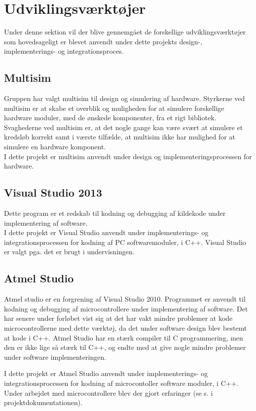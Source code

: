 \section{Udviklingsværktøjer}
Under denne sektion vil der blive gennemgået de forskellige udviklingsværktøjer som hovedsageligt er blevet anvendt under dette projekts design-, implementerings- og integrationsproces.

\subsection{Multisim}
Gruppen har valgt multisim til design og simulering af hardware. Styrkerne ved multisim er at skabe et overblik og muligheden for at simulere forskellige hardware moduler, med de ønskede komponenter, fra et rigt bibliotek. Svaghederne ved multisim er, at det nogle gange kan være svært at simulere et kredsløb korrekt samt i værste tilfælde, at multisim ikke har mulighed for at simulere en hardware komponent.\\
I dette projekt er multisim anvendt under design og implementeringsprocessen for hardware.

\subsection{Visual Studio 2013}
Dette program er et redskab til kodning og debugging af kildekode under implementering af software.\\
I dette projekt er Visual Studio anvendt under implementerings- og integrationsprocessen for kodning af PC softwaremoduler, i C++.
Visual Studio er valgt pga. det er brugt i undervisningen.

\subsection{Atmel Studio}
Atmel studio er en forgrening af Visual Studio 2010. Programmet er anvendt til kodning og debugging af microcontrollere under implementering af software. Det har senere under forløbet vist sig at det har vakt mindre problemer at kode microcontrollerne med dette værktøj, da det under software design blev bestemt at kode i C++. Atmel Studio har en stærk compiler til C programmering, men den er ikke lige så stærk til C++, og endte med at give nogle mindre problemer under software implementeringen.

I dette projekt er Atmel Studio anvendt under implementerings- og integrationsprocessen for kodning af microcontoller software moduler, i C++. Under arbejdet med microcontrollere blev der gjort erfaringer (se s. \pageref{P-sec:micro} i projektdokumentationen). %
